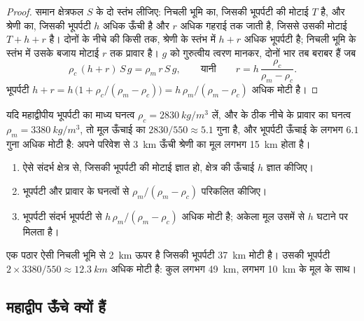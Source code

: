 \begin{proof}
समान क्षेत्रफल $S$ के दो स्तंभ लीजिए: निचली भूमि का, जिसकी भूपर्पटी की मोटाई
$T$ है, और श्रेणी का, जिसकी भूपर्पटी $h$ अधिक ऊँची है और $r$ अधिक गहराई तक जाती है, जिससे
उसकी मोटाई $T + h + r$ है। दोनों  के नीचे की किसी  तक,
श्रेणी के स्तंभ में $h + r$ अधिक भूपर्पटी है; निचली भूमि के स्तंभ में
उसके बजाय मोटाई $r$ तक प्रावार है। $g$ को गुरुत्वीय त्वरण मानकर,
दोनों भार तब बराबर हैं जब
\[
  \rho_c\,(h + r)\,S\,g = \rho_m\,r\,S\,g,
  \qquad\text{यानी}\qquad
  r = h\,\frac{\rho_c}{\rho_m - \rho_c}.
\]
भूपर्पटी $h + r = h\,\bigl(1 + \rho_c/(\rho_m - \rho_c)\bigr)
= h\,\rho_m/(\rho_m - \rho_c)$ अधिक मोटी है।
\end{proof}

यदि महाद्वीपीय भूपर्पटी का माध्य घनत्व $\rho_c =
\qty{2830}{kg/m^3}$ लें, और  के ठीक नीचे के प्रावार का घनत्व $\rho_m =
\qty{3380}{kg/m^3}$, तो मूल ऊँचाई का $2830/550 \approx 5.1$ गुना है,
और भूपर्पटी ऊँचाई के लगभग $6.1$ गुना अधिक मोटी है: अपने परिवेश से
\qty{3}{km} ऊँची श्रेणी का मूल लगभग \qty{15}{km} होता है।

\begin{method}[मूल का परिकलन]\label{met:g11:lithosphere-asthenosphere:root}
\begin{enumerate}
  \item ऐसे संदर्भ क्षेत्र से, जिसकी भूपर्पटी की मोटाई ज्ञात हो, क्षेत्र की ऊँचाई $h$
        ज्ञात कीजिए।
  \item भूपर्पटी और प्रावार के घनत्वों से $\rho_m/(\rho_m - \rho_c)$
        परिकलित कीजिए।
  \item भूपर्पटी संदर्भ भूपर्पटी से $h\,\rho_m/(\rho_m -
        \rho_c)$ अधिक मोटी है; अकेला मूल उसमें से $h$ घटाने पर मिलता है।
\end{enumerate}
\end{method}

\begin{example}[\qty{2}{km} ऊँचा एक पठार]\label{ex:g11:lithosphere-asthenosphere:plateau}
एक पठार ऐसी निचली भूमि से \qty{2}{km} ऊपर है जिसकी भूपर्पटी \qty{37}{km}
मोटी है। उसकी भूपर्पटी $2 \times 3380/550 \approx \qty{12.3}{km}$ अधिक मोटी है:
कुल लगभग \qty{49}{km}, लगभग \qty{10}{km} के मूल के साथ।
\end{example}

\subsection{महाद्वीप ऊँचे क्यों हैं}


